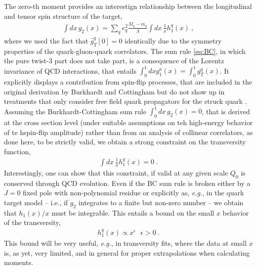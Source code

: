 \documentclass[preprintnumbers,floatfix,nofootinbib]{revtex4}
\newcommand{\eg}{{\em e.g.}}
\newcommand{\mj}{M_q}
\newcommand{\mq}{m_q}
\begin{document}
The zero-th moment provides an interestign relationship between the longitudinal and tensor spin structure of the target,
\begin{align}
  \label{eq:BC}
  \int dx\, g_2(x) = \sum_q e_q^2 \frac{\mj-\mq}{\Lambda} \int dx\, \frac{1}{x} h_1^q(x) \ ,
\end{align}
where we used the fact that $\hat g_T^q[0]=0$ identically due to the symmetry properties of the quark-gluon-quark correlators. The sum rule \eqref{eq:BC}, in which the pure twist-3 part does not take part, is a consequence of the Lorentz invariance of QCD interactions, that entails $\int_0^1 dx g_1^a(x) = \int_0^1 g_T^q(x)$. It explicitly displays a contribution from spin-flip processes, that are included in the original derivation by Burkhardt and Cottingham \cite{BC} but do not show up in treatments that only consider free field quark propagators for the struck quark \cite{Jaffe-lectures}. Assuming the Burkhardt-Cottingham sum rule $\int_0^1 dx\, g_2(x) =0$, that is derived at the cross section level (under suitable assumptions on teh high-energy behavior of te hspin-flip amplitude) rather than from an analysis of collinear correlators, as done here, to be strictly valid, we obtain a strong constraint on the transversity function,
\begin{align}
   \int dx\, \frac{1}{x} h_1^q(x) = 0 \ .
\label{eq:ABsumrule}
\end{align}
Interestingly, one can show that this constraint, if valid at any given scale $Q_0$ is conserved through QCD evolution. Even if the BC sum rule is broken either by a $J = 0$ fixed pole with non-polynomial residue \cite{Jaffe-lectures} or explicitly as, \eg, in the quark target model \cite{Metz-Kundu)} -- i.e., if $g_2$ integrates to a finite but non-zero number -- we obtain that $h_1(x)/x$ must be integrable. This entails a bound on the small $x$ behavior of the transversity,
\begin{align}
  h_1^q(x) \propto x^\epsilon \ \ \ \epsilon>0 \ .
\label{eq:ABbound}
\end{align}
This bound will be very useful, \eg, in transversity fits, where the data at small $x$ is, as yet, very limited, and in general for proper extrapolations when calculating moments.
\end{document}
